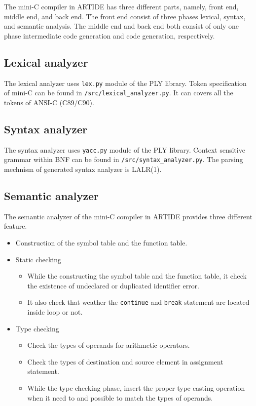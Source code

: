 \documentclass{article}
\newcommand{\code}[1]{\texttt{#1}}
\begin{document}
	The mini-C compiler in ARTIDE has three different parts, namely, front end, middle end, and back end. The front end consist of three phases lexical, syntax, and semantic analysis. The middle end and back end both consist of only one phase intermediate code generation and code generation, respectively.
	
	\subsection{Lexical analyzer}
	
	The lexical analyzer uses \code{lex.py} module of the PLY library. Token specification of mini-C can be found in \code{/src/lexical\_analyzer.py}. It can covers all the tokens of ANSI-C (C89/C90).
	
	\subsection{Syntax analyzer}
	
	The syntax analyzer uses \code{yacc.py} module of the PLY library. Context sensitive grammar within BNF can be found in \code{/src/syntax\_analyzer.py}. The parsing mechnism of generated syntax analyzer is LALR(1).
	
	\subsection{Semantic analyzer}
	
	The semantic analyzer of the mini-C compiler in ARTIDE provides three different feature.
	
	\begin{itemize}
		\item Construction of the symbol table and the function table.
		
		\item Static checking
		
		\begin{itemize}
			\item While the constructing the symbol table and the function table, it check the existence of undeclared or duplicated identifier error.
			
			\item It also check that weather the \code{continue} and \code{break} statement are located inside loop or not.
		\end{itemize}
		
		\item Type checking
		
		\begin{itemize}
			\item Check the types of operands for arithmetic operators.
			\item Check the types of destination and source element in assignment statement.
			\item While the type checking phase, insert the proper type casting operation when it need to and possible to match the types of operands. 
		\end{itemize}
	\end{itemize}
	
\end{document}
